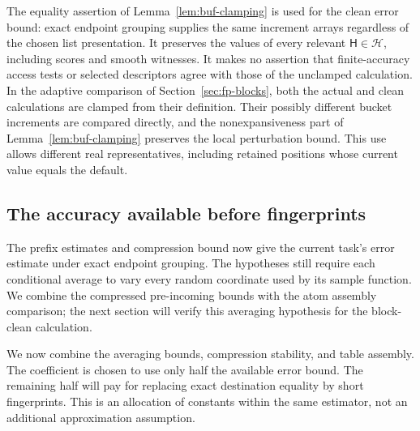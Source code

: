 \documentclass[11pt]{article}
\numberwithin{equation}{section}
\theoremstyle{definition}
\theoremstyle{remark}
\begin{document}
The equality assertion of Lemma~\ref{lem:buf-clamping} is used for the
clean error bound: exact endpoint grouping supplies the same increment
arrays regardless of the chosen list presentation.  It preserves the
values of every relevant ${\mathsf{H}}\in\mathcal H$, including scores and smooth
witnesses.  It makes no assertion that finite-accuracy access tests or
selected descriptors agree with those of the unclamped calculation.
In the adaptive comparison of Section~\ref{sec:fp-blocks}, both the actual
and clean calculations are clamped from their definition.  Their
possibly different bucket increments are compared directly, and the
nonexpansiveness part of Lemma~\ref{lem:buf-clamping} preserves the local
perturbation bound.  This use allows different real representatives,
including retained positions whose current value equals the default.

\subsection{The accuracy available before fingerprints}

The prefix estimates and compression bound now give the current task's
error estimate under exact endpoint grouping.  The hypotheses still
require each conditional average to vary every random coordinate used
by its sample function.  We combine the compressed pre-incoming bounds
with the atom assembly comparison; the next section will verify this
averaging hypothesis for the block-clean calculation.

We now combine the averaging bounds, compression stability, and table assembly. The coefficient is chosen to use only half the available error bound. The remaining half will pay for replacing exact destination equality by short fingerprints. This is an allocation of constants within the same estimator, not an additional approximation assumption.
\end{document}
